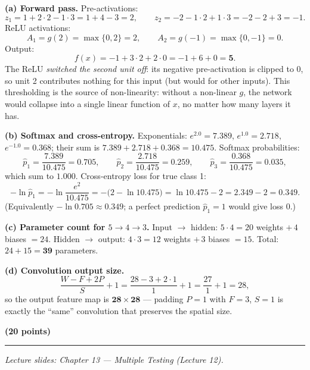\documentclass[11pt,a4paper]{article}
\newcommand{\problem}[2]{\par\vspace{7mm}\noindent{\large\textbf{Problem #1}}%
  \hfill{\large\textbf{(#2 points)}}\par\nopagebreak\vspace{0.6mm}%
  \noindent\rule{\textwidth}{0.6pt}\par\nopagebreak\vspace{2.5mm}}
\begin{document}
\ifdefined\withsolutions
\begin{solutionbox}
\textbf{(a) Forward pass.}
Pre-activations:
\[
  z_1=1+2\cdot 2-1\cdot 3=1+4-3=2,\qquad
  z_2=-2-1\cdot 2+1\cdot 3=-2-2+3=-1 .
\]
ReLU activations:
\[
  A_1=g(2)=\max\{0,2\}=2,\qquad A_2=g(-1)=\max\{0,-1\}=0 .
\]
Output:
\[
  f(x)=-1+3\cdot 2+2\cdot 0=-1+6+0=\mathbf{5}.
\]
The ReLU \emph{switched the second unit off}: its negative pre-activation is clipped to $0$,
so unit 2 contributes nothing for this input (but would for other inputs). This thresholding
is the source of non-linearity: without a non-linear $g$, the network would collapse into a
single linear function of $x$, no matter how many layers it has.

\medskip
\textbf{(b) Softmax and cross-entropy.}
Exponentials: $e^{2.0}=7.389$, $e^{1.0}=2.718$, $e^{-1.0}=0.368$; their sum is
$7.389+2.718+0.368=10.475$. Softmax probabilities:
\[
  \hat{p}_1=\frac{7.389}{10.475}=0.705,\qquad
  \hat{p}_2=\frac{2.718}{10.475}=0.259,\qquad
  \hat{p}_3=\frac{0.368}{10.475}=0.035,
\]
which sum to $1.000$. Cross-entropy loss for true class 1:
\[
  -\ln\hat{p}_1=-\ln\frac{e^{2}}{10.475}=-\bigl(2-\ln 10.475\bigr)=\ln 10.475-2=2.349-2=\mathbf{0.349}.
\]
(Equivalently $-\ln 0.705\approx 0.349$; a perfect prediction $\hat{p}_1=1$ would give loss 0.)

\medskip
\textbf{(c) Parameter count for $5\to 4\to 3$.}
Input $\to$ hidden: $5\cdot 4=20$ weights $+\,4$ biases $=24$.
Hidden $\to$ output: $4\cdot 3=12$ weights $+\,3$ biases $=15$.
Total: $24+15=\mathbf{39}$ parameters.

\medskip
\textbf{(d) Convolution output size.}
\[
  \frac{W-F+2P}{S}+1=\frac{28-3+2\cdot 1}{1}+1=\frac{27}{1}+1=28,
\]
so the output feature map is $\mathbf{28\times 28}$ --- padding $P=1$ with $F=3$, $S=1$ is
exactly the ``same'' convolution that preserves the spatial size.
\end{solutionbox}
\fi

\problem{6: Multiple testing}{20}
{\small\itshape Lecture slides: Chapter 13 --- Multiple Testing (Lecture 12).}\par\vspace{1mm}
\end{document}
